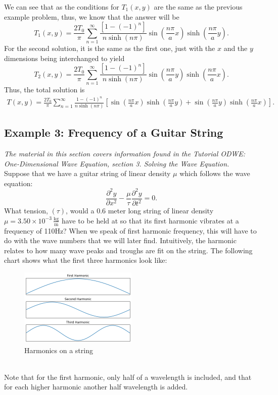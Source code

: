 \documentclass[11pt]{report}
\newcommand{\sdel}[2]{\dfrac{\partial^2{#1}}{\partial{#2}^2}} %
\newcommand{\fpar}[1]{\left({#1}\right)}
\newcommand{\fbrac}[1]{\left[{#1}\right]}
\begin{document}
We can see that as the conditions for $T_1(x,y)$ are the same as the previous example problem, thus, we know that the answer will be
    \[T_1(x,y) = \frac{2T_0}{\pi}\sum_{n=1}^\infty \frac{\fbrac{1-(-1)^n}}{n\sinh\fpar{n\pi}}\sin\fpar{\frac{n\pi}{a}x}\sinh\fpar{\frac{n\pi}{a}y}.\]
For the second solution, it is the same as the first one, just with the $x$ and the $y$ dimensions being interchanged to yield
    \[T_2(x,y) = \frac{2T_0}{\pi}\sum_{n=1}^\infty \frac{\fbrac{1-(-1)^n}}{n\sinh\fpar{n\pi}}\sin\fpar{\frac{n\pi}{a}y}\sinh\fpar{\frac{n\pi}{a}x}.\]
Thus, the total solution is
    \begin{align*}
        T(x,y) = \frac{2T_0}{\pi}\sum_{n=1}^\infty\frac{1-\fpar{-1}^n}{n\sinh\fpar{n\pi}}\fbrac{\sin\fpar{\frac{n\pi}{a}x}\sinh\fpar{\frac{n\pi}{a}y}+\sin\fpar{\frac{n\pi}{a}y}\sinh\fpar{\frac{n\pi}{a}x}}.
    \end{align*}
    
    
\subsection{Example 3: Frequency of a Guitar String}

\emph{The material in this section covers information found in the Tutorial ODWE: One-Dimensional Wave Equation, section 3. Solving the Wave Equation.}\\

Suppose that we have a guitar string of linear density $\mu$ which follows the wave equation:
    \[\sdel{y}{x}-\frac{\mu}{\tau}\sdel{y}{t}=0.\]
What tension, $\fpar{\tau}$, would a $0.6$ meter long string of linear density $\mu = 3.50\times10^{-3}\, \frac{\text{kg}}{\text{m}}$ have to be held at so that its first harmonic vibrates at a frequency of 110Hz? When we speak of first harmonic frequency, this will have to do with the wave numbers that we will later find. Intuitively, the harmonic relates to how many wave peaks and troughs are fit on the string. The following chart shows what the first three harmonics look like: %
\begin{figure}[H]
\caption{Harmonics on a string}
\centering
\includegraphics[width=0.5\textwidth]{Harmonics.png}
\end{figure}
\\Note that for the first harmonic, only half of a wavelength is included, and that for each higher harmonic another half wavelength is added.
\\
    
\end{document}
